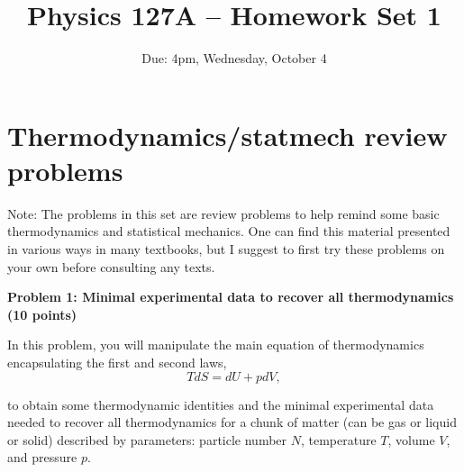 \documentclass{article}
\title{Physics 127A – Homework Set 1}
\date{Due: 4pm, Wednesday, October 4}
\begin{document}
\maketitle

\section*{Thermodynamics/statmech review problems}

Note: The problems in this set are review problems to help remind some basic thermodynamics and statistical mechanics. One can find this material presented in various ways in many textbooks, but I suggest to first try these problems on your own before consulting any texts.

\textbf{Problem 1: Minimal experimental data to recover all thermodynamics (10 points)}

In this problem, you will manipulate the main equation of thermodynamics encapsulating the first and second laws,
\begin{equation}
    TdS = dU + pdV , \label{eq:main_eq}
\end{equation}

to obtain some thermodynamic identities and the minimal experimental data needed to recover all thermodynamics for a chunk of matter (can be gas or liquid or solid) described by parameters: particle number $N$, temperature $T$, volume $V$, and pressure $p$.
\end{document}
